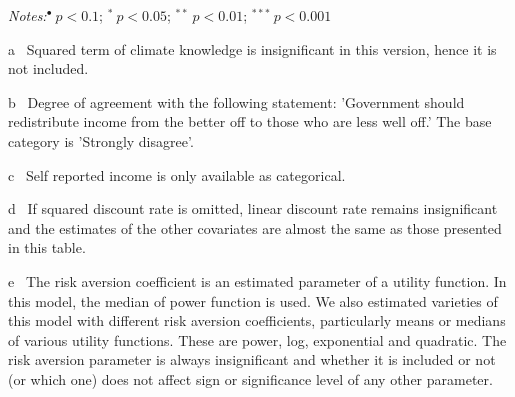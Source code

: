 \documentclass[a4paper,12pt]{article}
\begin{document}
{\begin{threeparttable}
\begin{tablenotes}
\begin{footnotesize}
 \item \textit{Notes:}\hspace{0.2cm}$^{\bullet}~p<0.1$; $^{*}~p<0.05$; $^{**}~p<0.01$; $^{***}~p<0.001$
 \begin{adjustwidth}{0.9cm}{}
  \vspace{-0.3cm}
 \item[a]~Squared term of climate knowledge is insignificant in this version, hence it is not included.
  \item[b]~Degree of agreement with the following statement: 'Government should redistribute income from the better off to those who are less well off.' The base category is 'Strongly disagree'.
  \item[c]~Self reported income is only available as categorical.
  \item[d]~If squared discount rate is omitted, linear discount rate remains insignificant and the estimates of the other covariates are almost the same as those presented in this table.
  \item[e]~The risk aversion coefficient is an estimated parameter of a utility function. In this model, the median of power function is used. We also estimated varieties of this model with different risk aversion coefficients, particularly means or medians of various utility functions. These are power, log, exponential and quadratic. The risk aversion parameter is always insignificant and whether it is included or not (or which one) does not affect sign or significance level of any other parameter.
     \end{adjustwidth}    
\singlespacing  
  \end{footnotesize}
\end{tablenotes}
  \end{threeparttable} 
\par}

\pagebreak
\end{document}
